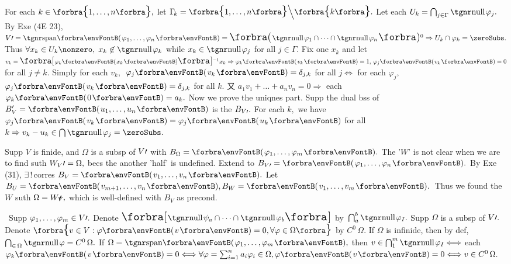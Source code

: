 For each $k\in\Bra{1,\dots,n},$ let $\Gamma_{\!k}=\Bra{1,\dots,n}\Backslash[\Big]\Bra{k}.$ Let each $U_k=\bigcap_{j\in\Gamma}\null\varphi_j.$\parSol{}
By Exe (4E 23), $V\apostrophe=\Span{\varphi_1,\dots,\varphi_n}=\BigPar{\null\varphi_1\cap\cdots\cap\null\varphi_n}{^0}\Rightarrow U_k\cap\varphi_k=\zeroSubs.$\parSol{}
Thus $\forall x_k\in U_k\nonzero,\;x_k\not\in\null\varphi_k$ while $x_k\in\null\varphi_j$ for all $j\in\Gamma.$\parSol{}
Fix one $x_k$ and let $v_k=\Sbra{\varphi_k\Par{x_k}}{^{-1}}x_k\Rightarrow\varphi_k\Par{v_k}=1,\,\varphi_j\Par{v_k}=0$ for all $j\neq k.$\parSol{}
Simply for each $v_k,$ \,$\varphi_j\Par{v_k}=\delta_{j,k}$ for all $j\Longleftrightarrow$ for each $\varphi_j,$ $\varphi_j\Par{v_k}=\delta_{j,k}$ for all $k.$\parSol{}
又 $a_1v_1+\dots+a_nv_n=0\Rightarrow$ each $\varphi_k\Par{0}=a_k.$\vspace{2pt}\parSol{}
Now we prove the uniqnes part. Supp the dual bss of $B_V'=\Par{u_1,\dots,u_n}$ is the $B_{V\prime}.$\parSol{}
For each $k,$ we have $\varphi_j\Par{v_k}=\varphi_j\Par{u_k}$ for all $k\Rightarrow v_k-u_k\in\bigcap\null\varphi_j=\zeroSubs.$\PfEnd
\SepLine

\BulletPointX{}\;\;Supp $V$ is finide, and $\Omega$ is a subsp of $V\prime$ with $B_{\Omega}=\Par{\varphi_1,\dots,\varphi_m}.$\TextB{}
The '$W$' is not clear when we are to find suth $W_V\prime=\Omega,$ becs the another 'half' is undefined.\TextB{}
Extend to $B_{V\apostrophe}=\Par{\varphi_1,\dots,\varphi_n}.$ By Exe (31), $\exists\,!\,$corres $B_V=\Par{v_1,\dots,v_n}.$\TextB{}
Let $B_U=\Par{v_{m+1},\dots,v_n},B_W=\Par{v_1,\dots,v_m}.$ \,Thus we found the $W$ suth $\Omega=W_V\!\!\!\prime\,,$\TextB{}
which is well-defined with $B_V$ as precond.
\SepLine
\pagebreak

\BulletPointX{}\,\,\,Supp $\varphi_1,\dots,\varphi_m\in V\prime.$ Denote $\Sbra{\null\psi_a\cap\cdots\cap\null\varphi_b}$ by \,$\bigcap_a^b\null\varphi_I.$\TextB{}
Supp $\Omega$ is a subsp of $V\prime.$ Denote $\Bra{v\in V:\varphi\Par{v}=0,\forall\varphi\in\Omega}$ by $C^0\,\Omega.$\TextB{\vspace{1pt}}
If $\Omega$ is infinide, then by def, $\bigcap_{\in\,\Omega}\null\varphi=C^0\,\Omega.$ \; If $\Omega=\Span{\varphi_1,\dots,\varphi_m},$\TextB{}
then $v\in\bigcap_1^m\null\varphi_I\Longleftrightarrow$ each $\varphi_k\Par{v}=0\Longleftrightarrow\forall\varphi=\sum_{i=1}^na_i\varphi_i\in\Omega,\varphi\Par{v}=0\Longleftrightarrow v\in C^0\,\Omega.$
\SepLine

